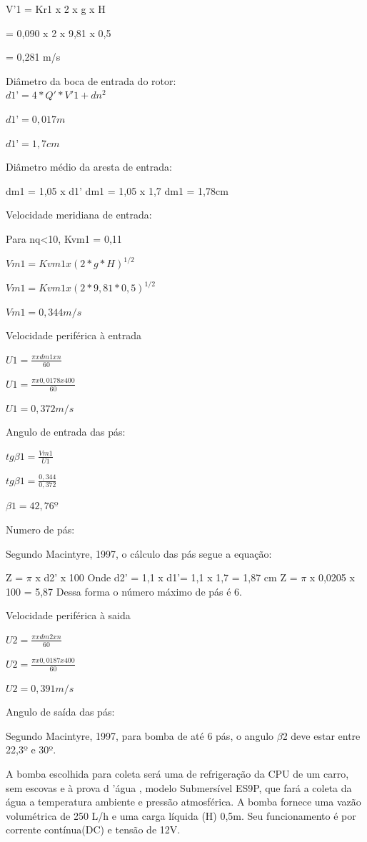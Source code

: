     V’1 = Kr1 x 2 x g x H
    
    = 0,090 x 2 x 9,81 x 0,5
    
    = 0,281 m/s
    
Diâmetro da boca de entrada do rotor:\\

$d1’ = 4 * Q' * V'1 + dn^{2} $

$d1’ = 0,017m$

$d1’ = 1,7cm$


Diâmetro médio da aresta de entrada:

dm1 = 1,05 x d1’ 
dm1 = 1,05 x 1,7
dm1 = 1,78cm

Velocidade meridiana de entrada:

Para nq<10, Kvm1 = 0,11

$Vm1 = Kvm1 x (2 * g * H)^{1/2}$

$Vm1 = Kvm1 x (2 * 9,81 * 0,5)^{1/2}$

$Vm1 = 0,344 m/s$

Velocidade periférica à entrada

$U1 =  \frac{\pi  x dm1 x n}{60}$

$U1 = \frac{\pi  x 0,0178 x 400}{ 60}$

$U1 = 0,372 m/s$


Angulo de entrada das pás:

$tg \beta1= \frac{Vm1}{U1}$

$tg \beta1= \frac{0,344}{ 0,372}$

$\beta1= 42,76º$


Numero de pás:

Segundo Macintyre, 1997, o cálculo das pás segue a equação:

Z = $\pi$ x d2’ x 100
Onde d2’ = 1,1 x d1’= 1,1 x 1,7 = 1,87 cm
Z = $\pi$ x 0,0205 x 100 = 5,87
Dessa forma o número máximo de pás é 6.

Velocidade periférica à saida

$U2 =  \frac{\pi  x dm2 x n}{60}$

$U2 =  \frac{\pi  x 0,0187 x 400}{60}$

$U2 = 0,391 m/s$

Angulo de saída das pás:

Segundo Macintyre, 1997, para bomba de até 6 pás, o angulo $\beta$2 deve estar entre 22,3º e 30º.

A bomba escolhida para coleta será uma de refrigeração da CPU de um carro, sem escovas e à prova d 'água , modelo Submersível ES9P, que fará a coleta da água a temperatura ambiente e pressão atmosférica. A bomba fornece uma vazão volumétrica de 250 L/h e uma carga líquida (H) 0,5m. Seu funcionamento é por corrente contínua(DC) e tensão de 12V.

